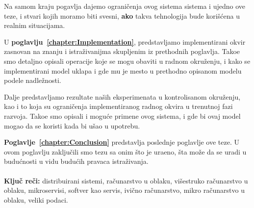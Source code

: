 Na samom kraju pogavlja dajemo ograni\v cenja ovog sistema sistema i ujedno ove teze, i stvari kojih moramo biti svesni, \textbf{ako} takva tehnologija bude kori\v s\'cena u realnim situacijama.

U \textbf{poglavlju~\ref{chapter:Implementation}}, predstavljamo implementirani okvir zasnovan na znanju i istra\v zivanijma skupljenim iz prethodnih poglavlja. Tako\dj e smo detaljno opisali operacije koje se mogu obaviti u radnom okru\v zenju, i kako se implementirani model uklapa i gde mu je mesto u prethodno opisanom modelu podele nadle\v znosti.

Dalje predstavljamo rezultate na\v sih eksperimenata u kontrolisanom okru\v zenju, kao i to koja su ograni\v cenja implementiranog radnog okvira u trenutnoj fazi razvoja. Tako\dj e smo opisali i mogu\'ce primene ovog sistema, i gde bi ovaj model mogao da se koristi kada bi u\v sao u upotrebu.

\textbf{Poglavlje~\ref{chapter:Conclusion}} predstavlja poslednje poglavlje ove teze. U ovom poglavlju zaklju\v cili smo tezu sa onim što je ura\dj eno, \v sta mo\v ze da se uradi u budu\'cnosti u vidu budu\'cih pravaca istra\v zivanja.\\\\

\noindent
\textbf{Klju\v c re\v ci:} distribuirani sistemi, ra\v cunarstvo u oblaku, vi\v sestruko ra\v cunarstvo u oblaku, mikroservisi, softver kao servis, ivi\v cno ra\v cunarstvo, mikro ra\v cunarstvo u oblaku, veliki podaci.